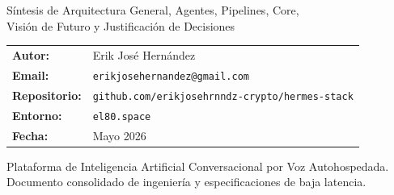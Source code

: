 \documentclass[12pt,a4paper,openany]{book}
\begin{document}
\begin{titlepage}
  \pagecolor{hermesdark}
  \color{white}
  \centering
  \vspace*{2cm}


  \vspace{1.5cm}
  {\sffamily\large Síntesis de Arquitectura General, Agentes, Pipelines, Core,\\
   Visión de Futuro y Justificación de Decisiones}

  \vspace{2cm}
  \begin{tabular}{ll}
    \textsf{\textbf{Autor:}}     & Erik José Hernández \\[4pt]
    \textsf{\textbf{Email:}}     & \texttt{erikjosehernandez@gmail.com} \\[4pt]
    \textsf{\textbf{Repositorio:}}& \texttt{github.com/erikjosehrnndz-crypto/hermes-stack} \\[4pt]
    \textsf{\textbf{Entorno:}}   & \texttt{el80.space} \\[4pt]
    \textsf{\textbf{Fecha:}}     & Mayo 2026 \\
  \end{tabular}

  \vfill
  {\small\color{white!60}
    Plataforma de Inteligencia Artificial Conversacional por Voz Autohospedada.\\
    Documento consolidado de ingeniería y especificaciones de baja latencia.
  }
\end{titlepage}
\nopagecolor

\frontmatter
\tableofcontents
\listoftables
\mainmatter

\end{document}
